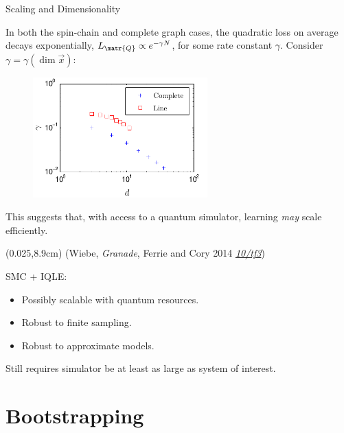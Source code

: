 \documentclass[xcolor=dvipsnames, compress]{beamer}
\renewcommand\UrlFont{\color{red}\rmfamily\itshape}
\newcommand{\shortdoi}[1]{\href{http://doi.org/#1}{\UrlFont 10/#1}}
\newcommand{\bottomnote}[1]{
  \begin{textblock*}{0.95\paperwidth} (0.025\paperwidth,8.9cm)
    {\tiny \hfill #1}
  \end{textblock*}
}
\begin{document}
\begin{frame}{Scaling and Dimensionality}

    In both the spin-chain and complete graph cases, the quadratic
    loss on average decays exponentially,
    \(
      L_{\matr{Q}} \propto e^{-\gamma N}
    \),
    for some rate constant $\gamma$.
    \pause
    Consider $\gamma = \gamma(\dim \vec{x})$:
    \begin{figure}
      \includegraphics[width=0.6\textwidth]{exp_scale}
    \end{figure}

    This suggests that, with access to a quantum simulator,
    learning \emph{may} scale efficiently.

  \bottomnote{(Wiebe, \emph{Granade}, Ferrie and Cory 2014 \shortdoi{tf3})}

\end{frame}

\begin{frame}

  SMC + IQLE:

  \begin{itemize}
    \item Possibly scalable with quantum resources.
    \item Robust to finite sampling.
    \item Robust to approximate models.
  \end{itemize}

  \begin{block}{}
    Still requires simulator be at least as large as system of interest.
  \end{block}

\end{frame}


\section{Bootstrapping}
\end{document}
